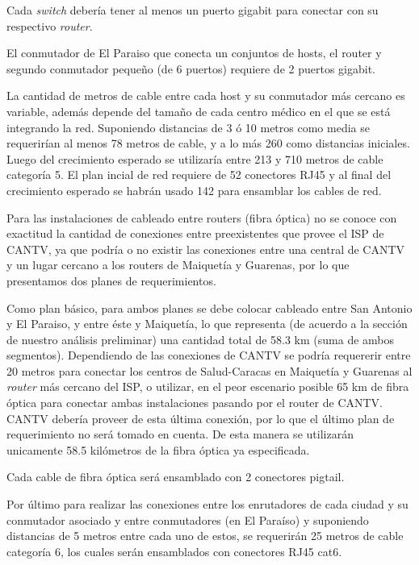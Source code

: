\documentclass[]{article}
\begin{document}
Cada \emph{switch} debería tener al menos un puerto gigabit para
conectar con su respectivo \emph{router}.

El conmutador de El Paraiso que conecta un conjuntos de hosts, el router
y segundo conmutador pequeño (de 6 puertos) requiere de 2 puertos
gigabit.

La cantidad de metros de cable entre cada host y su conmutador más
cercano es variable, además depende del tamaño de cada centro médico en
el que se está integrando la red. Suponiendo distancias de 3 ó 10 metros
como media se requerirían al menos 78 metros de cable, y a lo más 260
como distancias iniciales. Luego del crecimiento esperado se utilizaría
entre 213 y 710 metros de cable categoría 5. El plan incial de red
requiere de 52 conectores RJ45 y al final del crecimiento esperado se
habrán usado 142 para ensamblar los cables de red.

Para las instalaciones de cableado entre routers (fibra óptica) no se
conoce con exactitud la cantidad de conexiones entre preexistentes que
provee el ISP de CANTV, ya que podría o no existir las conexiones entre
una central de CANTV y un lugar cercano a los routers de Maiquetía y
Guarenas, por lo que presentamos dos planes de requerimientos.

Como plan básico, para ambos planes se debe colocar cableado entre San
Antonio y El Paraiso, y entre éste y Maiquetía, lo que representa (de
acuerdo a la sección de nuestro análisis preliminar) una cantidad total
de 58.3 km (suma de ambos segmentos). Dependiendo de las conexiones de
CANTV se podría requererir entre 20 metros para conectar los centros de
Salud-Caracas en Maiquetía y Guarenas al \emph{router} más cercano del
ISP, o utilizar, en el peor escenario posible 65 km de fibra óptica para
conectar ambas instalaciones pasando por el router de CANTV. CANTV
debería proveer de esta última conexión, por lo que el último plan de
requerimiento no será tomado en cuenta. De esta manera se utilizarán
unicamente 58.5 kilómetros de la fibra óptica ya especificada.

Cada cable de fibra óptica será ensamblado con 2 conectores pigtail.

Por último para realizar las conexiones entre los enrutadores de cada
ciudad y su conmutador asociado y entre conmutadores (en El Paraíso) y
suponiendo distancias de 5 metros entre cada uno de estos, se requerirán
25 metros de cable categoría 6, los cuales serán ensamblados con
conectores RJ45 cat6.

\newpage
\end{document}
